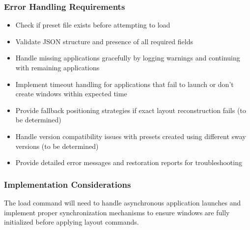 \subsubsection{Error Handling Requirements}
\begin{itemize}
    \item Check if preset file exists before attempting to load
    \item Validate JSON structure and presence of all required fields
    \item Handle missing applications gracefully by logging warnings and continuing with remaining applications
    \item Implement timeout handling for applications that fail to launch or don't create windows within expected time
    \item Provide fallback positioning strategies if exact layout reconstruction fails (to be determined)
    \item Handle version compatibility issues with presets created using different sway versions (to be determined)
    \item Provide detailed error messages and restoration reports for troubleshooting
\end{itemize}

\subsubsection{Implementation Considerations}

The load command will need to handle asynchronous application launches and implement proper synchronization mechanisms to ensure windows are fully initialized before applying layout commands.
